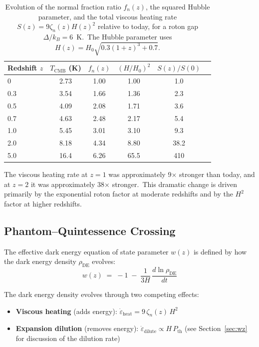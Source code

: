 \documentclass[12pt,letterpaper]{article}
\begin{document}
\begin{table}[h]
\centering
\begin{tabular}{@{}lccccc@{}}
\toprule
Redshift $z$ & $T_{\mathrm{CMB}}$ (K) & $f_n(z)$ &
  $(H/H_0)^2$ & $S(z)/S(0)$ \\
\midrule
0   & 2.73 & 1.00 & 1.00  & 1.0 \\
0.3 & 3.54 & 1.66 & 1.36 & 2.3 \\
0.5 & 4.09 & 2.08 & 1.71 & 3.6 \\
0.7 & 4.63 & 2.48 & 2.17 & 5.4 \\
1.0 & 5.45 & 3.01 & 3.10 & 9.3 \\
2.0 & 8.18 & 4.34 & 8.80 & 38.2 \\
5.0 & 16.4 & 6.26 & 65.5 & 410 \\
\bottomrule
\end{tabular}
\caption{Evolution of the normal fraction ratio $f_n(z)$, the squared Hubble
  parameter, and the total viscous heating rate $S(z) = 9\zeta_n(z)H(z)^2$
  relative to today, for a roton gap $\Delta/k_B = 6$~K.\ The Hubble parameter
  uses $H(z) = H_0\sqrt{0.3(1+z)^3 + 0.7}$.}
\label{tab:heating}
\end{table}

The viscous heating rate at $z = 1$ was approximately 9$\times$ stronger than
today, and at $z = 2$ it was approximately 38$\times$ stronger.\ This dramatic
change is driven primarily by the exponential roton factor at moderate redshifts
and by the $H^2$ factor at higher redshifts.


\subsection{Phantom--Quintessence Crossing}

The effective dark energy equation of state parameter $w(z)$ is defined by how
the dark energy density $\rho_{\mathrm{DE}}$ evolves:
%
\begin{equation}
  w(z) \;=\; -1 \;-\; \frac{1}{3H}\,\frac{d\ln\rho_{\mathrm{DE}}}{dt}
  \label{eq:w-definition}
\end{equation}

The dark energy density evolves through two competing effects:

\begin{itemize}[leftmargin=2em]
  \item \textbf{Viscous heating} (adds energy):
    $\dot\varepsilon_{\mathrm{heat}} = 9\,\zeta_n(z)\,H^2$
  \item \textbf{Expansion dilution} (removes energy):
    $\dot\varepsilon_{\mathrm{dilute}} \propto H\,P_{\mathrm{th}}$
    (see Section~\ref{sec:wz} for discussion of the dilution rate)
\end{itemize}
\end{document}

